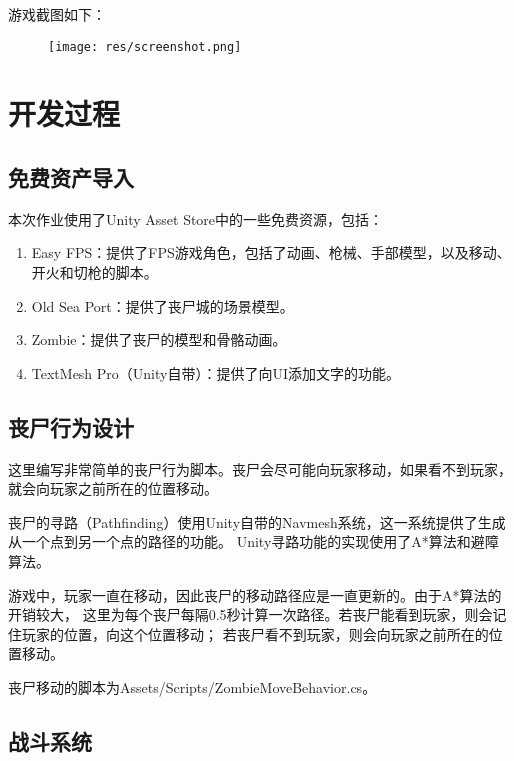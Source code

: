 \documentclass{article}
\begin{document}
游戏截图如下：

\begin{figure}[H]
    \begin{center}
        \texttt{[image: res/screenshot.png]}
    \end{center}
\end{figure}

\section{开发过程}

\subsection{免费资产导入}

本次作业使用了Unity Asset Store中的一些免费资源，包括：

\begin{enumerate}
    \item Easy FPS：提供了FPS游戏角色，包括了动画、枪械、手部模型，以及移动、开火和切枪的脚本。
    \item Old Sea Port：提供了丧尸城的场景模型。
    \item Zombie：提供了丧尸的模型和骨骼动画。
    \item TextMesh Pro（Unity自带）：提供了向UI添加文字的功能。
\end{enumerate}

\subsection{丧尸行为设计}

这里编写非常简单的丧尸行为脚本。丧尸会尽可能向玩家移动，如果看不到玩家，就会向玩家之前所在的位置移动。

丧尸的寻路（Pathfinding）使用Unity自带的Navmesh系统，这一系统提供了生成从一个点到另一个点的路径的功能。
Unity寻路功能的实现使用了A*算法和避障算法。

游戏中，玩家一直在移动，因此丧尸的移动路径应是一直更新的。由于A*算法的开销较大，
这里为每个丧尸每隔0.5秒计算一次路径。若丧尸能看到玩家，则会记住玩家的位置，向这个位置移动；
若丧尸看不到玩家，则会向玩家之前所在的位置移动。

丧尸移动的脚本为Assets/Scripts/ZombieMoveBehavior.cs。

\subsection{战斗系统}
\end{document}
